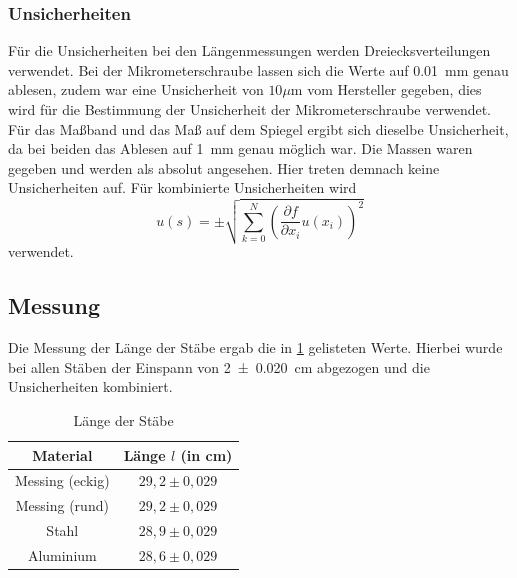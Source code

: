 \documentclass[11pt,a4paper,titlepage, ngerman]{article}
\begin{document}
		\subsubsection*{Unsicherheiten}
		
			Für die Unsicherheiten bei den Längenmessungen werden Dreiecksverteilungen verwendet. Bei der Mikrometerschraube lassen sich die Werte auf \SI{0,01}{\mm} genau ablesen, zudem war eine Unsicherheit von $10\mu $m vom Hersteller gegeben, dies wird für die Bestimmung der Unsicherheit der Mikrometerschraube verwendet. Für das Maßband und das Maß auf dem Spiegel ergibt sich dieselbe Unsicherheit, da bei beiden das Ablesen auf \SI{1}{\mm} genau möglich war.
			Die Massen waren gegeben und werden als absolut angesehen. Hier treten demnach keine Unsicherheiten auf.
			Für kombinierte Unsicherheiten wird
			\begin{equation}
				u(s) = \pm \sqrt{\sum_{k=0}^{N}\left( \frac{\partial f}{\partial x_i}u(x_i)\right) ^2} \label{eq:kombUnsicherheit}
			\end{equation}
			verwendet.
				
	\subsection{Messung}
		
		Die Messung der Länge der Stäbe ergab die in \cref{tab:Stablängen} gelisteten Werte. Hierbei wurde bei allen Stäben der Einspann von \SI{2+-0,020}{\cm} abgezogen und die Unsicherheiten kombiniert.
		\begin{table}[h]
			\caption{Länge der Stäbe}
			\centering
			\label{tab:Stablängen}
			\begin{tabular}{c|c}
				{Material} & {Länge $l$ (in cm)}\\
				\hline
				{Messing (eckig)} & {$29,2\pm 0,029$}\\
				{Messing (rund)} &  {$29,2\pm 0,029$}\\
				{Stahl} & {$28,9\pm 0,029$}\\
				{Aluminium} & {$28,6\pm 0,029$}\\		
			\end{tabular}
		\end{table}
		
\end{document}
